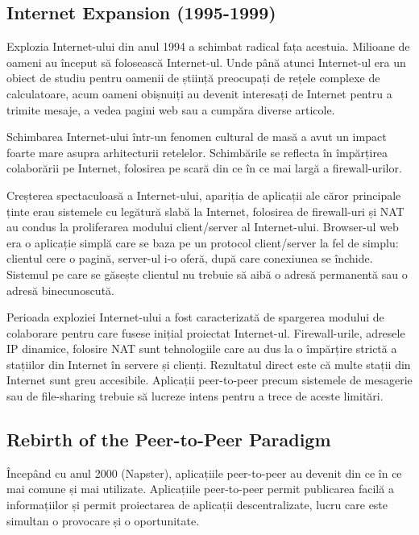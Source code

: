 \subsection{Internet Expansion (1995-1999)}

Explozia Internet-ului din anul 1994 a schimbat radical fața acestuia.
Milioane de oameni au început să folosească Internet-ul. Unde până atunci
Internet-ul era un obiect de studiu pentru oamenii de știință preocupați de
rețele complexe de calculatoare, acum oameni obișnuiți au devenit interesați
de Internet pentru a trimite mesaje, a vedea pagini web sau a cumpăra diverse
articole.

Schimbarea Internet-ului într-un fenomen cultural de masă a avut un impact
foarte mare asupra arhitecturii retelelor. Schimbările se reflecta în
împărțirea colaborării pe Internet, folosirea pe scară din ce în ce mai largă
a firewall-urilor.

Creșterea spectaculoasă a Internet-ului, apariția de aplicații ale căror
principale ținte erau sistemele cu legătură slabă la Internet, folosirea de
firewall-uri și NAT au condus la proliferarea modului client/server al
Internet-ului. Browser-ul web era o aplicație simplă care se baza pe un
protocol client/server la fel de simplu: clientul cere o pagină, server-ul i-o
oferă, după care conexiunea se închide. Sistemul pe care se găsește clientul
nu trebuie să aibă o adresă permanentă sau o adresă binecunoscută.

Perioada exploziei Internet-ului a fost caracterizată de spargerea modului de
colaborare pentru care fusese inițial proiectat Internet-ul. Firewall-urile,
adresele IP dinamice, folosire NAT sunt tehnologiile care au dus la o
împărțire strictă a stațiilor din Internet în servere și clienți. Rezultatul
direct este că multe stații din Internet sunt greu accesibile. Aplicații
peer-to-peer precum sistemele de mesagerie sau de file-sharing trebuie să
lucreze intens pentru a trece de aceste limitări.

\subsection{Rebirth of the Peer-to-Peer Paradigm}

Începând cu anul 2000 (Napster), aplicațiile peer-to-peer au devenit din ce în
ce mai comune și mai utilizate. Aplicațiile peer-to-peer permit publicarea
facilă a informațiilor și permit proiectarea de aplicații descentralizate,
lucru care este simultan o provocare și o oportunitate.


